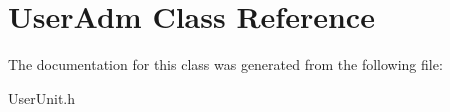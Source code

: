 \hypertarget{classUserAdm}{\section{User\-Adm Class Reference}
\label{de/dac/classUserAdm}
}


The documentation for this class was generated from the following file\-:\begin{DoxyCompactItemize}
\item 
User\-Unit.\-h\end{DoxyCompactItemize}
